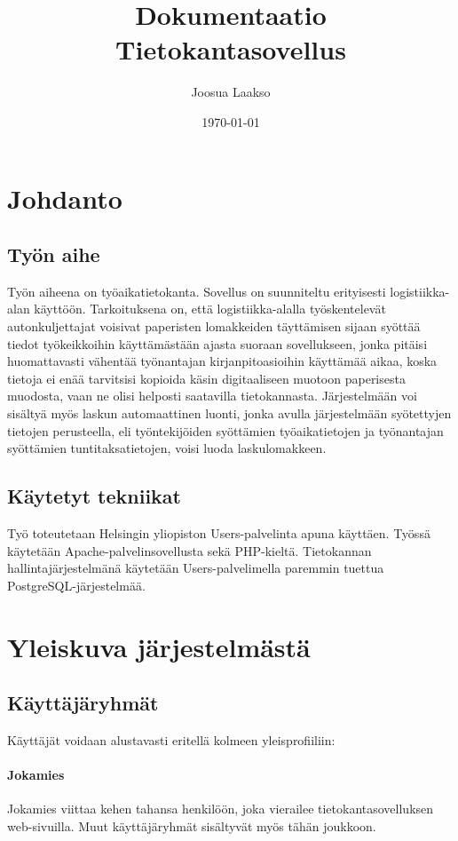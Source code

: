 \documentclass[a4paper, 12pt finnish]{article}
\title{Dokumentaatio \\ \large Tietokantasovellus}
\author{Joosua Laakso}
\date{\today}
\begin{document}
\maketitle

\section{Johdanto} 
\subsection{Työn aihe} Työn aiheena on työaikatietokanta. Sovellus on
suunniteltu erityisesti logistiikka-alan käyttöön. Tarkoituksena on, että
logistiikka-alalla työskentelevät autonkuljettajat voisivat paperisten
lomakkeiden täyttämisen sijaan syöttää tiedot työkeikkoihin käyttämästään
ajasta suoraan sovellukseen, jonka pitäisi huomattavasti vähentää 
työnantajan kirjanpitoasioihin käyttämää aikaa, koska tietoja ei enää
tarvitsisi kopioida käsin digitaaliseen muotoon paperisesta muodosta, vaan
ne olisi helposti saatavilla tietokannasta. Järjestelmään voi sisältyä
myös laskun automaattinen luonti, jonka avulla järjestelmään syötettyjen
tietojen perusteella, eli työntekijöiden syöttämien työaikatietojen ja 
työnantajan syöttämien tuntitaksatietojen, voisi luoda laskulomakkeen.

\subsection{Käytetyt tekniikat} Työ toteutetaan Helsingin yliopiston 
Users-palvelinta apuna käyttäen. Työssä käytetään Apache-palvelinsovellusta
sekä PHP-kieltä. Tietokannan hallintajärjestelmänä käytetään
Users-palvelimella paremmin tuettua PostgreSQL-järjestelmää.

\newpage
\tableofcontents
\newpage

\section{Yleiskuva järjestelmästä}
\subsection{Käyttäjäryhmät} Käyttäjät voidaan alustavasti eritellä kolmeen
yleisprofiiliin:
\paragraph{Jokamies} Jokamies viittaa kehen tahansa henkilöön, joka
vierailee tietokantasovelluksen web-sivuilla. Muut käyttäjäryhmät 
sisältyvät myös tähän joukkoon.
\end{document}
